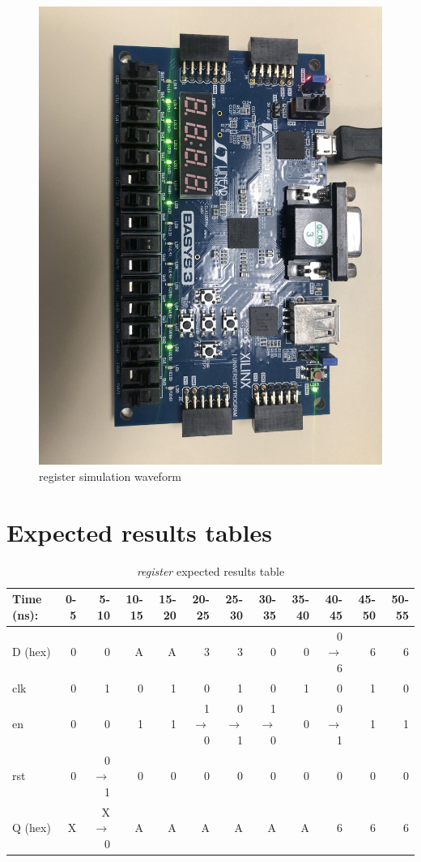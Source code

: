 \documentclass[11pt]{article}
\begin{document}
\begin{figure}[ht]\centering
	\includegraphics[width= \textwidth ]{bb8.png}
	\caption{register simulation waveform}
	\label{fig: bb8}
\end{figure}
\clearpage
\section*{Expected results tables}

\begin{table}[ht]\centering
	\caption{\textit{register} expected results table}
	\label{ALU:tbl:register_ERT}\medskip
	\begin{tabular}{l|rrrrrrrrrrr}
		Time (ns): & 0-5 & 5-10 & 10-15 & 15-20 & 20-25 & 25-30 & 30-35 & 35-40 & 40-45 & 45-50 & 50-55 \\
		\midrule
		D (hex) & 0 & 0 	  & A & A & 3 	    & 3 	  & 0 	    & 0 & 0$\to$6 & 6 & 6 \\
		clk     & 0 & 1 	  & 0 & 1 & 0 	    & 1 	  & 0 	    & 1 & 0 	  & 1 & 0 \\
		en  	& 0 & 0 	  & 1 & 1 & 1$\to$0 & 0$\to$1 & 1$\to$0 & 0 & 0$\to$1 & 1 & 1 \\
		rst 	& 0 & 0$\to$1 & 0 & 0 & 0 		& 0 	  & 0		& 0 & 0		  & 0 & 0 \\
		\midrule
		Q (hex) & X & X$\to$0 & A & A & A & A & A & A & 6 & 6 &  6\\
		\bottomrule
	\end{tabular}
\end{table}
\end{document}
